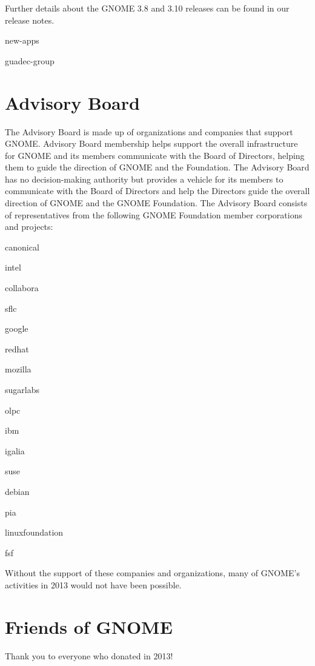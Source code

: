 \documentclass{scrreprt}
\begin{document}
Further details about the GNOME 3.8 and 3.10 releases can be found in our release notes.



new-apps



guadec-group

\section{Advisory Board}

The Advisory Board is made up of organizations and companies that support GNOME. Advisory Board membership helps support the overall infrastructure for GNOME and its members communicate with the Board of Directors, helping them to guide the direction of GNOME and the Foundation. The Advisory Board has no decision-making authority but provides a vehicle for its members to communicate with the Board of Directors and help the Directors guide the overall direction of GNOME and the GNOME Foundation.
The Advisory Board consists of representatives from the following GNOME Foundation member corporations and projects:

canonical

intel

collabora

sflc

google

redhat

mozilla

sugarlabs

olpc

ibm

igalia

suse

debian

pia

linuxfoundation

fsf

Without the support of these companies and organizations, many of GNOME's activities in 2013 would not have been possible.


\section{Friends of GNOME}

Thank you to everyone who donated in 2013!
\end{document}
